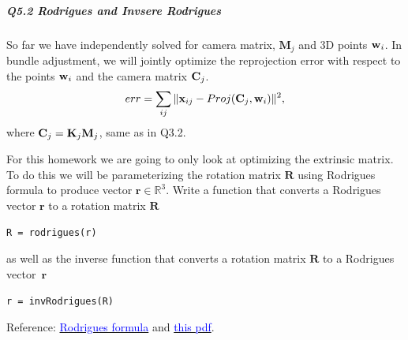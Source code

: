 \subparagraph*{Q5.2 Rodrigues and Invsere Rodrigues}
So far we have independently solved for camera matrix, $\mathbf{M}_j$ and 3D points ${\bf w}_i$. In bundle adjustment, we will jointly optimize the reprojection error with respect to the points ${\bf w}_i$ and the camera matrix ${\bf C}_j$.
$$
err = \sum_{ij} \|{\bf x}_{ij} - Proj(\mathbf{C}_j, {\bf w}_i)\|^2,
$$
where ${\bf C}_j = \mathbf{K}_j \mathbf{M}_j$, same as in Q3.2.

For this homework we are going to only look at optimizing the extrinsic matrix. To do this we will be parameterizing the rotation matrix $\mathbf{R}$ using Rodrigues formula to produce vector $\mathbf{r} \in \mathbb{R}^3$. Write a function that converts a Rodrigues vector $\mathbf{r}$ to a rotation matrix $\mathbf{R}$
\begin{center}
\texttt{R = rodrigues(r)}
\end{center}
as well as the inverse function that converts a rotation matrix $\mathbf{R}$ to a Rodrigues vector~$\mathbf{r}$
\begin{center}
\texttt{r = invRodrigues(R)}
\end{center}
Reference: \href{https://en.wikipedia.org/wiki/Rodrigues\%27\_formula}{\textcolor{blue}{Rodrigues formula}} and \href{https://www2.cs.duke.edu/courses/fall13/compsci527/notes/rodrigues.pdf}{\textcolor{blue}{this pdf}}.


